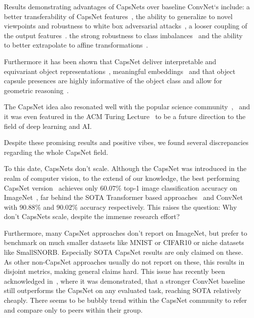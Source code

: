 \documentclass{article}
\begin{document}
Results demonstrating advantages of CapsNets over baseline ConvNet`s include:
a better transferability of CapsNet features~\cite{corr/Ancheng2018},
the ability to generalize to novel viewpoints and robustness to white box adversarial attacks~\cite{iclr/HintonSF18},
a looser coupling of the output features~\cite{corr/Lin2018}.
the strong robustness to class imbalances~\cite{miccai/Jimenez-Sanchez18} and
the ability to better extrapolate to affine transformations~\cite{cvpr/GuT20}.

Furthermore it has been shown that CapsNet deliver interpretable and equivariant object representations~\cite{nips/LenssenFL18}, meaningful embeddings~\cite{corr/Lin2018} and that object capsule presences are highly informative of the object class and allow for geometric reasoning~\cite{nips/KosiorekSTH19}.

The CapsNet idea also resonated well with the popular science community~\cite{book/hawkins2021},~\cite{book/Hiesinger2021} and it was even featured in the ACM Turing Lecture~\cite{comacm/Bengio2021} to be a future direction to the field of deep learning and AI.

Despite these promising results and positive vibes, we found several discrepancies regarding the whole CapsNet field.

To this date, CapsNets don't scale. Although the CapsNet was introduced in the realm of computer vision, to the extend of our knowledge, the best performing CapsNet version~\cite{nips/AhmedT19} achieves only $60.07\%$ top-1 image classification accuracy on ImageNet~\cite{data/imagenet}, far behind the SOTA Transformer based approaches~\cite{corr/Wortsman2022} and  ConvNet~\cite{cvpr/Pham2021} with $90.88\%$ and  $90.02\%$ accuracy respectively.
This raises the question: Why don't CapsNets scale, despite the immense research effort?

Furthermore, many CapsNet approaches don't report on ImageNet, but prefer to benchmark on much smaller datasets like MNIST or CIFAR10 or niche datasets like SmallSNORB. %
Especially SOTA CapsNet results are only claimed on these. %
As other non-CapsNet approaches usually do not report on these, this results in disjoint metrics, making general claims hard.
This issue has recently been acknowledged in~\cite{cvpr/GuT021}, where it was demonstrated, that a stronger ConvNet baseline still outperforms the CapsNet on any evaluated task, reaching SOTA relatively cheaply.
There seems to be bubbly trend within the CapsNet community to refer and compare only to peers within their group.
\end{document}
